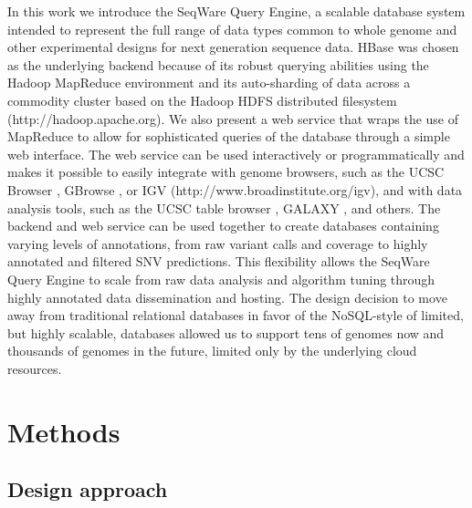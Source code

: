 \documentclass[10pt]{bmc_article}
\newenvironment{bmcformat}{\begin{raggedright}\baselineskip20pt\sloppy\setboolean{publ}{false}}{\end{raggedright}\baselineskip20pt\sloppy}
\begin{document}
\begin{bmcformat}
In this work we introduce the SeqWare Query Engine, a scalable database system intended to represent the full range of data types common to whole genome and other experimental designs for next generation sequence data. HBase was chosen as the underlying backend because of its robust querying abilities using the Hadoop MapReduce environment and its auto-sharding of data across a commodity cluster based on the Hadoop HDFS distributed filesystem (http://hadoop.apache.org). We also present a web service that wraps the use of MapReduce to allow for sophisticated queries of the database through a simple web interface. The web service can be used interactively or programmatically and makes it possible to easily integrate with genome browsers, such as the UCSC Browser \cite{kent2002human}, GBrowse \cite{stein2002generic}, or IGV (http://www.broadinstitute.org/igv), and with data analysis tools, such as the UCSC table browser \cite{karolchik2004ucsc}, GALAXY \cite{giardine2005galaxy}, and others. The backend and web service can be used together to create databases containing varying levels of annotations, from raw variant calls and coverage to highly annotated and filtered SNV predictions. This flexibility allows the SeqWare Query Engine to scale from raw data analysis and algorithm tuning through highly annotated data dissemination and hosting. The design decision to move away from traditional relational databases in favor of the NoSQL-style of limited, but highly scalable, databases allowed us to support tens of genomes now and thousands of genomes in the future, limited only by the underlying cloud resources.

\section*{Methods}

\subsection*{Design approach}


\end{bmcformat}
\end{document}
